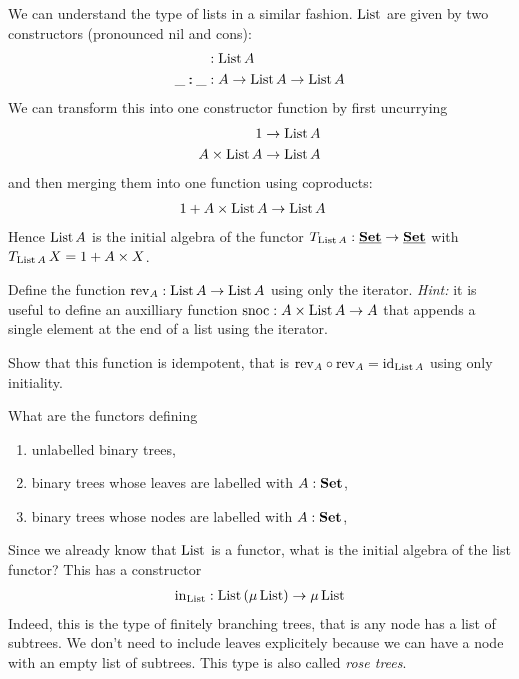 We can understand the type of lists in a similar fashion. $\mathrm{List}$ are given by two constructors (pronounced nil and cons):
\begin{align*}
[] & : \List\,A \\
\_\cons\_ & : A \to \List\,A \to \List\,A
\end{align*}
We can transform this into one constructor function by first uncurrying
\begin{align*}
1 & \to \mathrm{List}\,A \\
A \times \mathrm{List}\,A & \to \mathrm{List}\,A
\end{align*}
and then merging them into one function using coproducts:
\begin{align*}
1 + A \times \mathrm{List}\,A & \to \mathrm{List}\,A
\end{align*}
Hence $\mathrm{List}\,A$ is the initial algebra of the functor $T_{\mathrm{List}\,A}:\underline{\mathbf{\mathbf{Set}}} \to \underline{\mathbf{\mathbf{Set}}}$ with $T_{\mathrm{List}\,A}\,X = 1 + A \times X$.
\begin{Exercise}
Define the function $\mathrm{rev}_A : \mathrm{List}\,A \to \mathrm{List}\,A$ using only the iterator. \emph{Hint:} it is useful to define an auxilliary function 
$\mathrm{snoc} : A \times\mathrm{List}\,A \to A$ that appends a single element at the end of a list using the iterator. 

Show that this function is idempotent, that is $\mathrm{rev}_A \circ \mathrm{rev}_A = \mathrm{id}_{\mathrm{List}\,A}$ using only initiality. 
\end{Exercise}

\begin{Exercise}
What are the functors defining 
\begin{enumerate}
\item unlabelled binary trees,
\item binary trees whose leaves are labelled with $A:\mathbf{Set}$,
\item binary trees whose nodes  are labelled with $A:\mathbf{Set}$,
\end{enumerate}
\end{Exercise}

Since we already know that $\mathrm{List}$ is a functor, what is the initial algebra of the list functor? This has a constructor
\begin{align*}
\mathrm{in}_{\mathrm{List}} : \mathrm{List} \,(\mu\,\mathrm{List}) \to \mu\,\mathrm{List}
\end{align*}
Indeed, this is the type of finitely branching trees, that is any node has a list of subtrees. We don't need to include leaves explicitely because we can have a node with an empty list of subtrees. This type is also called \emph{rose trees}.

